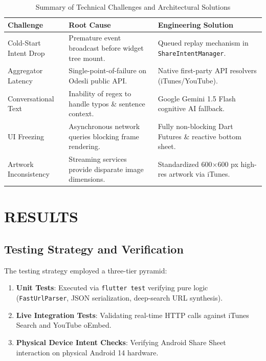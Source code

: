 \documentclass[12pt,a4paper]{report}
\begin{document}
\begin{table}[H]
\centering
\caption{Summary of Technical Challenges and Architectural Solutions}
\label{tab:challenges_summary}
\begin{tabularx}{\textwidth}{lXX}
\toprule
\textbf{Challenge} & \textbf{Root Cause} & \textbf{Engineering Solution} \\
\midrule
Cold-Start Intent Drop & Premature event broadcast before widget tree mount. & Queued replay mechanism in \texttt{ShareIntentManager}. \\
Aggregator Latency & Single-point-of-failure on Odesli public API. & Native first-party API resolvers (iTunes/YouTube). \\
Conversational Text & Inability of regex to handle typos \& sentence context. & Google Gemini 1.5 Flash cognitive AI fallback. \\
UI Freezing & Asynchronous network queries blocking frame rendering. & Fully non-blocking Dart Futures \& reactive bottom sheet. \\
Artwork Inconsistency & Streaming services provide disparate image dimensions. & Standardized 600$\times$600 px high-res artwork via iTunes. \\
\bottomrule
\end{tabularx}
\end{table}

\chapter{RESULTS}

\section{Testing Strategy and Verification}
The testing strategy employed a three-tier pyramid:
\begin{enumerate}
    \item \textbf{Unit Tests}: Executed via \texttt{flutter test} verifying pure logic (\texttt{FastUrlParser}, JSON serialization, deep-search URL synthesis).
    \item \textbf{Live Integration Tests}: Validating real-time HTTP calls against iTunes Search and YouTube oEmbed.
    \item \textbf{Physical Device Intent Checks}: Verifying Android Share Sheet interaction on physical Android 14 hardware.
\end{enumerate}
\end{document}
